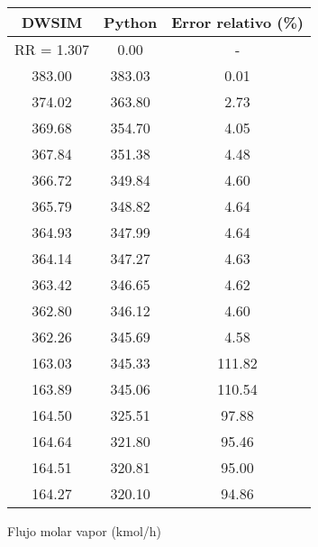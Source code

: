 \begin{figure}[H]
    \centering
    \caption{Flujo molar vapor (kmol/h)}
    \small
    \begin{tabular}{|c|c|c|}
        \hline
        \textbf{DWSIM} & \textbf{Python} & \textbf{Error relativo} (\%) \\
        \hline
        RR = 1.307     & 0.00            & -                            \\
        \hline
        383.00         & 383.03          & 0.01                         \\
        \hline
        374.02         & 363.80          & 2.73                         \\
        \hline
        369.68         & 354.70          & 4.05                         \\
        \hline
        367.84         & 351.38          & 4.48                         \\
        \hline
        366.72         & 349.84          & 4.60                         \\
        \hline
        365.79         & 348.82          & 4.64                         \\
        \hline
        364.93         & 347.99          & 4.64                         \\
        \hline
        364.14         & 347.27          & 4.63                         \\
        \hline
        363.42         & 346.65          & 4.62                         \\
        \hline
        362.80         & 346.12          & 4.60                         \\
        \hline
        362.26         & 345.69          & 4.58                         \\
        \hline
        163.03         & 345.33          & 111.82                       \\
        \hline
        163.89         & 345.06          & 110.54                       \\
        \hline
        164.50         & 325.51          & 97.88                        \\
        \hline
        164.64         & 321.80          & 95.46                        \\
        \hline
        164.51         & 320.81          & 95.00                        \\
        \hline
        164.27         & 320.10          & 94.86                        \\

\end{tabular}
\end{figure}
